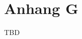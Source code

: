%
%
\glsresetall

\let\raggedsection\centering 
\chapter{Anhang G}\label{chap.appendix_fs}
\let\raggedsection\raggedright 
\begin{RaggedRight}
TBD
\end{RaggedRight}
